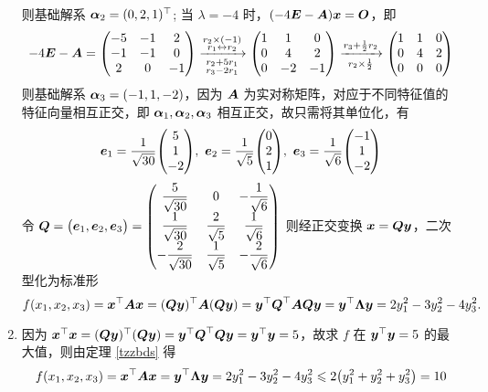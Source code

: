 \begin{solution}
\begin{enumerate}[label=(\arabic{*})]
              则基础解系 $\vb*{\alpha}_2=(0,2,1)^\top$; 当 $\lambda=-4$ 时，$(-4\vb*{E}-\vb*{A})\vb*{x}=\vb*{O}$，即
              $$-4\vb*{E}-\vb*{A}=\mqty(-5&-1&2\\-1&-1&0\\2&0&-1)\xrightarrow[\substack{r_2+5r_1\\r_3-2r_1}]{\substack{r_2\times(-1)\\r_1\leftrightarrow r_2}}\mqty(1&1&0\\0&4&2\\0&-2&-1)\xrightarrow[r_2\times\frac{1}{2}]{r_3+\frac{1}{2}r_2}\mqty(1&1&0\\0&4&2\\0&0&0)$$
              则基础解系 $\vb*{\alpha}_3=(-1,1,-2)$，因为 $\vb*{A}$ 为实对称矩阵，对应于不同特征值的特征向量相互正交，即 $\vb*{\alpha}_1,\vb*{\alpha}_2,\vb*{\alpha}_3$ 相互正交，故只需将其单位化，有
              $$\vb*{e}_1=\dfrac{1}{\sqrt{30}}\mqty(5\\1\\-2),~\vb*{e}_2=\dfrac{1}{\sqrt{5}}\mqty(0\\2\\1),~\vb*{e}_3=\dfrac{1}{\sqrt{6}}\mqty(-1\\1\\-2)$$
              令 $\vb*{Q}=\mqty(\vb*{e}_1,\vb*{e}_2,\vb*{e}_3)=\mqty(\dfrac{5}{\sqrt{30}}&0&-\dfrac{1}{\sqrt{6}}\\[6pt]
                  \dfrac{1}{\sqrt{30}}&\dfrac{2}{\sqrt{5}}&\dfrac{1}{\sqrt{6}}\\[6pt]
                  -\dfrac{2}{\sqrt{30}} & \dfrac{1}{\sqrt{5}} & -\dfrac{2}{\sqrt{6}}
                  )$ 则经正交变换 $\vb*{x}=\vb*{Qy}$，二次型化为标准形 $$f(x_1,x_2,x_3)=\vb*{x}^\top\vb*{Ax}=(\vb*{Qy})^\top\vb*{A}(\vb*{Qy})=\vb*{y}^\top\vb*{Q}^\top\vb*{AQy}=\vb*{y}^\top\vb*{\Lambda y}=2y_1^2-3y_2^2-4y_3^2.$$
        \item 因为 $\vb*{x}^\top\vb*{x}=(\vb*{Qy})^\top(\vb*{Qy})=\vb*{y}^\top\vb*{Q}^\top\vb*{Qy}=\vb*{y}^\top\vb*{y}=5$，故求 $f$ 在 $\vb*{y}^\top\vb*{y}=5$ 的最大值，则由定理 \ref{tzzbds} 得
              $$f(x_1,x_2,x_3)=\vb*{x}^\top\vb*{Ax}=\vb*{y}^\top\vb*{\Lambda y}=2y_1^2-3y_2^2-4y_3^2\leqslant 2\qty(y_1^2+y_2^2+y_3^2)=10$$
    \end{enumerate}
\end{solution}

